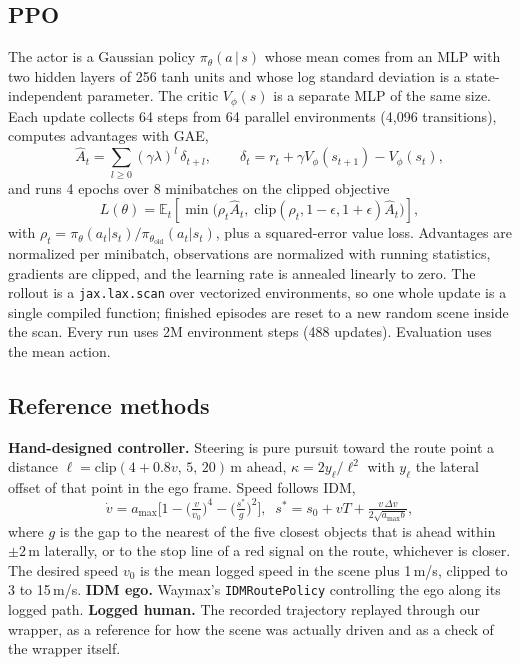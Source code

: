 \documentclass[conference]{IEEEtran}
\begin{document}
\subsection{PPO}
The actor is a Gaussian policy $\pi_\theta(a\,|\,s)$ whose mean comes from an MLP with two
hidden layers of 256 tanh units and whose log standard deviation is a state-independent
parameter. The critic $V_\phi(s)$ is a separate MLP of the same size. Each update
collects 64 steps from 64 parallel environments (4,096 transitions), computes advantages
with GAE,
\begin{equation}
\hat{A}_t=\sum_{l\ge 0}(\gamma\lambda)^l\,\delta_{t+l},\qquad
\delta_t=r_t+\gamma V_\phi(s_{t+1})-V_\phi(s_t),
\end{equation}
and runs 4 epochs over 8 minibatches on the clipped objective
\begin{equation}
L(\theta)=\mathbb{E}_t\!\left[\min\!\big(\rho_t\hat{A}_t,\;
\mathrm{clip}(\rho_t,1-\epsilon,1+\epsilon)\hat{A}_t\big)\right],
\end{equation}
with $\rho_t=\pi_\theta(a_t|s_t)/\pi_{\theta_\text{old}}(a_t|s_t)$, plus a squared-error
value loss. Advantages are normalized per minibatch, observations are normalized with
running statistics, gradients are clipped, and the learning rate is annealed linearly to
zero. The rollout is a \texttt{jax.lax.scan} over vectorized environments, so one whole
update is a single compiled function; finished episodes are reset to a new random scene
inside the scan. Every run uses 2M environment steps (488 updates). Evaluation uses the
mean action.

\subsection{Reference methods}
\textbf{Hand-designed controller.} Steering is pure pursuit toward the route point a
distance $\ell=\mathrm{clip}(4+0.8v,\,5,\,20)$\,m ahead, $\kappa=2y_\ell/\ell^2$ with
$y_\ell$ the lateral offset of that point in the ego frame. Speed follows IDM,
\begin{equation}
\dot v=a_{\max}\Big[1-\big(\tfrac{v}{v_0}\big)^4-\big(\tfrac{s^*}{g}\big)^2\Big],\;\;
s^*=s_0+vT+\tfrac{v\,\Delta v}{2\sqrt{a_{\max}b}},
\end{equation}
where $g$ is the gap to the nearest of the five closest objects that is ahead within $\pm 2$\,m laterally, or to the stop line of a red signal on the route, whichever is closer. The desired speed $v_0$ is the mean logged speed in the scene plus 1\,m/s, clipped to 3 to 15\,m/s.
\textbf{IDM ego.} Waymax's \texttt{IDMRoutePolicy} controlling the ego along its logged
path. \textbf{Logged human.} The recorded trajectory replayed through our wrapper, as a
reference for how the scene was actually driven and as a check of the wrapper itself.
\end{document}
